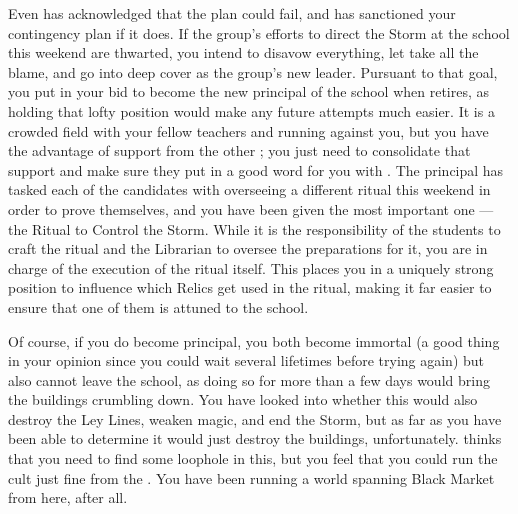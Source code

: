 \documentclass[char]{GL2020}
\begin{document}
Even \cChupLeader{} has acknowledged that the plan could fail, and has sanctioned your contingency plan if it does. If the group’s efforts to direct the Storm at the school this weekend are thwarted, you intend to disavow everything, let \cChupLeader{} take all the blame, and go into deep cover as the group's new leader. Pursuant to that goal, you put in your bid to become the new principal of the school when \cPrincipal{\intro} retires, as holding that lofty position would make any future attempts much easier. It is a crowded field with your fellow teachers \cMusic{\intro} and \cBeetle{\intro} running against you, but you have the advantage of support from the other \pGoaties{}; you just need to consolidate that support and make sure they put in a good word for you with \cPrincipal{}. The principal has tasked each of the candidates with overseeing a different ritual this weekend in order to prove themselves, and you have been given the most important one — the Ritual to Control the Storm. While it is the responsibility of the students to craft the ritual and the Librarian to oversee the preparations for it, you are in charge of the execution of the ritual itself. This places you in a uniquely strong position to influence which Relics get used in the ritual, making it far easier to ensure that one of them is attuned to the school. 

Of course, if you do become principal, you both become immortal (a good thing in your opinion since you could wait several lifetimes before trying again) but also cannot leave the school, as doing so for more than a few days would bring the buildings crumbling down. You have looked into whether this would also destroy the Ley Lines, weaken magic, and end the Storm, but as far as you have been able to determine it would just destroy the buildings, unfortunately. \cChupLeader{} thinks that you need to find some loophole in this, but you feel that you could run the cult just fine from the \pSchool{}. You have been running a world spanning Black Market from here, after all. 
\end{document}
